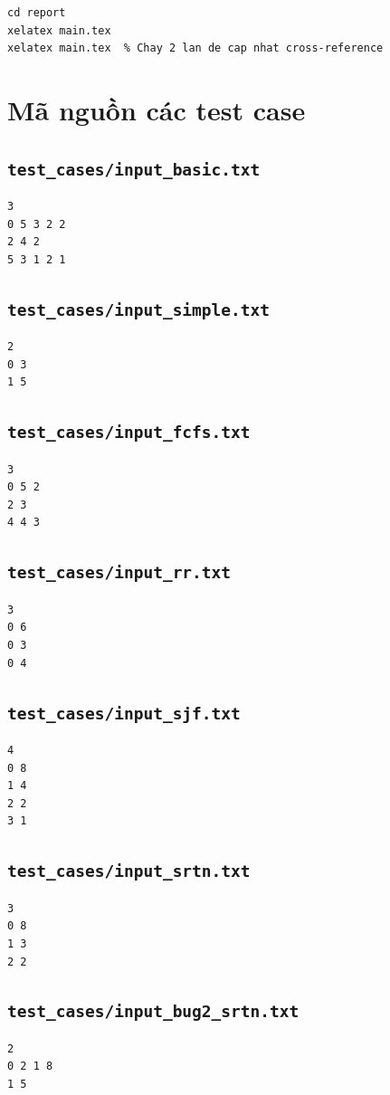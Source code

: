 \begin{verbatim}
cd report
xelatex main.tex
xelatex main.tex  % Chay 2 lan de cap nhat cross-reference
\end{verbatim}

\section{Mã nguồn các test case}

\subsection{\texttt{test\_cases/input\_basic.txt}}

\begin{verbatim}
3
0 5 3 2 2
2 4 2
5 3 1 2 1
\end{verbatim}

\subsection{\texttt{test\_cases/input\_simple.txt}}

\begin{verbatim}
2
0 3
1 5
\end{verbatim}

\subsection{\texttt{test\_cases/input\_fcfs.txt}}

\begin{verbatim}
3
0 5 2
2 3
4 4 3
\end{verbatim}

\subsection{\texttt{test\_cases/input\_rr.txt}}

\begin{verbatim}
3
0 6
0 3
0 4
\end{verbatim}

\subsection{\texttt{test\_cases/input\_sjf.txt}}

\begin{verbatim}
4
0 8
1 4
2 2
3 1
\end{verbatim}

\subsection{\texttt{test\_cases/input\_srtn.txt}}

\begin{verbatim}
3
0 8
1 3
2 2
\end{verbatim}

\subsection{\texttt{test\_cases/input\_bug2\_srtn.txt}}

\begin{verbatim}
2
0 2 1 8
1 5
\end{verbatim}
